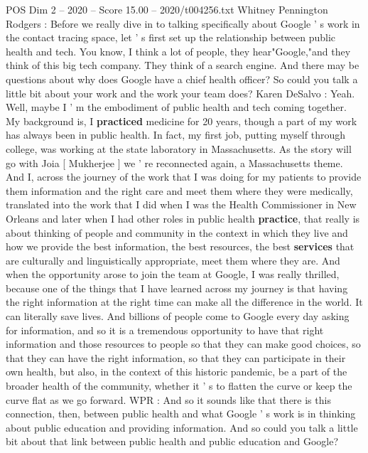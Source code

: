 \begin{textsample}{POS Dim 2 – 2020 – Score 15.00 – 2020/t004256.txt}  \label{ex:f2_pos_019}
Whitney Pennington Rodgers : Before we really dive in to talking specifically about Google ' s work in the contact tracing space, let ' s first set up the relationship between public health and tech.
You know, I think a lot of people, they hear"Google,"and they think of this big tech company.
They think of a search engine.
And there may be questions about why does Google have a chief health officer?
So could you talk a little bit about your work and the work your team does?
Karen DeSalvo : Yeah.
Well, maybe I ' m the embodiment of public health and tech coming together.
My background is, I \textbf{practiced} medicine for 20 years, though a part of my work has always been in public health.
In fact, my first job, putting myself through college, was working at the state laboratory in Massachusetts.
As the story will go with Joia [ Mukherjee ] we ' re reconnected again, a Massachusetts theme.
And I, across the journey of the work that I was doing for my patients to provide them information and the right care and meet them where they were medically, translated into the work that I did when I was the Health Commissioner in New Orleans and later when I had other roles in public health \textbf{practice}, that really is about thinking of people and community in the context in which they live and how we provide the best information, the best resources, the best \textbf{services} that are culturally and linguistically appropriate, meet them where they are.
And when the opportunity arose to join the team at Google, I was really thrilled, because one of the things that I have learned across my journey is that having the right information at the right time can make all the difference in the world.
It can literally save lives.
And billions of people come to Google every day asking for information, and so it is a tremendous opportunity to have that right information and those resources to people so that they can make good choices, so that they can have the right information, so that they can participate in their own health, but also, in the context of this historic pandemic, be a part of the broader health of the community, whether it ' s to flatten the curve or keep the curve flat as we go forward.
WPR : And so it sounds like that there is this connection, then, between public health and what Google ' s work is in thinking about public education and providing information.
And so could you talk a little bit about that link between public health and public education and Google?

\end{textsample}
